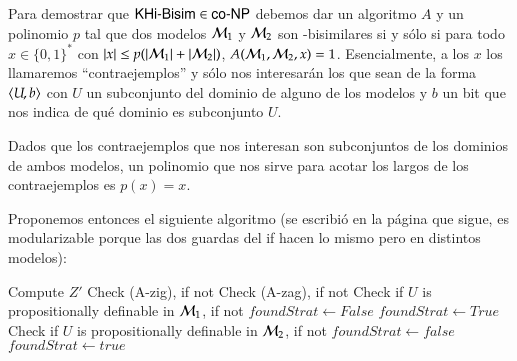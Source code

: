 \begin{demostracion}
    Para demostrar que $\rm\textsf{KHi-Bisim} \in \rm\textsf{co-NP}$ debemos dar un algoritmo $A$ y un polinomio $p$ tal que dos modelos $\mathcal{M}_1$ y $\mathcal{M}_2$ son \KHilogic-bisimilares si y sólo si para todo $x \in \{0,1\}^*$ con $|x| \le p(|\mathcal{M}_1|+|\mathcal{M}_2|)$,  $A(\mathcal{M}_1,\mathcal{M}_2,x) = 1$. Esencialmente, a los $x$ los llamaremos ``contraejemplos'' y sólo nos interesarán los que sean de la forma $\langle U,b \rangle$ con $U$ un subconjunto del dominio de alguno de los modelos y $b$ un bit que nos indica de qué dominio es subconjunto $U$. 

    Dados que los contraejemplos que nos interesan son subconjuntos de los dominios de ambos modelos, un polinomio que nos sirve para acotar los largos de los contraejemplos es $p(x) = x$. 

    Proponemos entonces el siguiente algoritmo (se escribió en la página que sigue, es modularizable porque las dos guardas del if hacen lo mismo pero en distintos modelos):

    \begin{algorithm}
        \begin{algorithmic}
            \small
            \State Compute $Z'$
            \State Check (A-zig), if not 
            \State Check (A-zag), if not 
            \State Check if $U$ is propositionally definable in $\mathcal{M}_1$, if not 
                        \State $foundStrat \gets False$
                                    \State $foundStrat \gets True$
                                \EndIf         
                            \EndFor
                            \EndIf
                        \EndIf
                    \EndFor
                \EndFor
            \Else
                \State Check if $U$ is propositionally definable in $\mathcal{M}_2$, if not 
                        \State $foundStrat \gets false$
                                    \State $foundStrat \gets true$
                                \EndIf         
                            \EndFor
                            \EndIf
                        \EndIf
                    \EndFor
                \EndFor
            \EndIf
            \State {}
            \end{algorithmic}
    \end{algorithm}


\end{demostracion}
